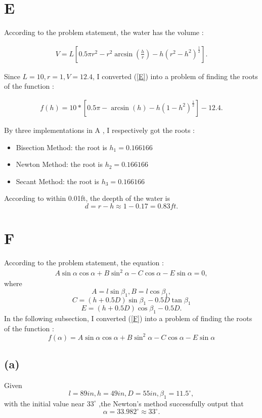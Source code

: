 \documentclass[a4paper]{article}
\begin{document}
\section{E}
According to the problem statement, the water has the volume :

\begin{align}\label{E}
V=L[0.5\pi r^2-r^2\arcsin(\frac{h}{r})-h(r^2-h^2)^{\frac{1}{2}}].
\end{align}

Since \( L = 10, r = 1, V = 12.4\), I converted (\ref{E}) into a problem of finding the roots of the function :

\begin{align}
  f(h)=10*[0.5\pi-\arcsin(h)-h(1-h^2)^{\frac{1}{2}}]-12.4.
\end{align}

By three implementations in A , I respectively got the roots :

\begin{itemize}  
  \item Bisection Method: the root is $h_1 = 0.166166$  
  \item Newton Method: the root is $h_2 = 0.166166$  
  \item Secant Method: the root is $h_3 = 0.166166$  
\end{itemize}  
According to within 0.01ft, the deepth of the water is
$$d = r - h \approx 1 - 0.17 = 0.83ft.$$

\section{F}
According to the problem statement, the equation :
\begin{align}\label{F}
  A\sin\alpha \cos\alpha +B\sin^2 \alpha-C\cos \alpha -E\sin\alpha = 0,
\end{align}
where
$$A = l\sin\beta_1, B = l\cos\beta_1,$$
$$C = (h+0.5D)\sin\beta_1 - 0.5D\tan \beta_1$$
$$E = (h+0.5D)\cos\beta_1-0.5D.$$
In the following subsection, I converted (\ref{F}) into a problem of finding the roots of the function :
$$f(\alpha) = A\sin\alpha \cos\alpha +B\sin^2 \alpha-C\cos \alpha -E\sin\alpha$$
\subsection*{(a)}
Given $$ l = 89 in, h = 49 in, D = 55 in, \beta_1 = 11.5^{\circ},$$ with the initial value near $33^{\circ}$ ,the Newton's method successfully output that 
$$\alpha = 33.982^{\circ} \approx 33^{\circ}.$$
\end{document}
